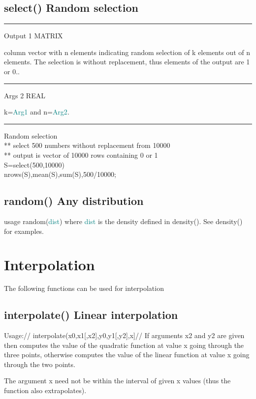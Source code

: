 \subsection{\textcolor{VioletRed}{select}() Random selection}
\label{select}
\vspace{0.3cm}
\hrule
\vspace{0.3cm}
\noindent Output \tabto{3cm} 1 \tabto{5cm}  MATRIX  \tabto{7cm}
\begin{changemargin}{3cm}{0cm}
\noindent column vector with n elements indicating random
selection of k
elements out of n elements. The selection is without replacement,
thus elements of the output are 1 or 0..
\end{changemargin}
\vspace{0.3cm}
\hrule
\vspace{0.3cm}
\noindent Args \tabto{3cm} 2 \tabto{5cm}  REAL \tabto{7cm}
\begin{changemargin}{3cm}{0cm}
\noindent  k=\textcolor{teal}{Arg1} and n=\textcolor{teal}{Arg2}.
\end {changemargin}
\hrule
\vspace{0.2cm}
\begin{example}[selectex]Random selection\\
\label{selectex}
** select 500 numbers without replacement from 10000\\
** output is vector of 10000 rows containing 0 or 1\\
S=\textcolor{VioletRed}{select}(500,10000)\\
\textcolor{VioletRed}{nrows}(S),\textcolor{VioletRed}{mean}(S),\textcolor{VioletRed}{sum}(S),500/10000;
\end{example}
\subsection{\textcolor{VioletRed}{random}()  Any distribution}
\label{random}
usage \textcolor{VioletRed}{random}(\textcolor{teal}{dist}) where \textcolor{teal}{dist} is the density defined in \textcolor{VioletRed}{density}().
See \textcolor{VioletRed}{density}() for examples.
\section{Interpolation}
\label{inter}
The following functions can be used for interpolation
\subsection{\textcolor{VioletRed}{interpolate}() Linear interpolation}
\label{interpolate}
Usage://
\textcolor{VioletRed}{interpolate}(x0,x1[,x2],y0,y1[,y2],x]//
If arguments x2 and y2 are given then computes the value of the quadratic function at value
x going through the three points, otherwise computes the value of the linear function at value
x going through the two points.
\begin{note}
The argument x need not be within the interval of given x values (thus the function also
extrapolates).
\end{note}

